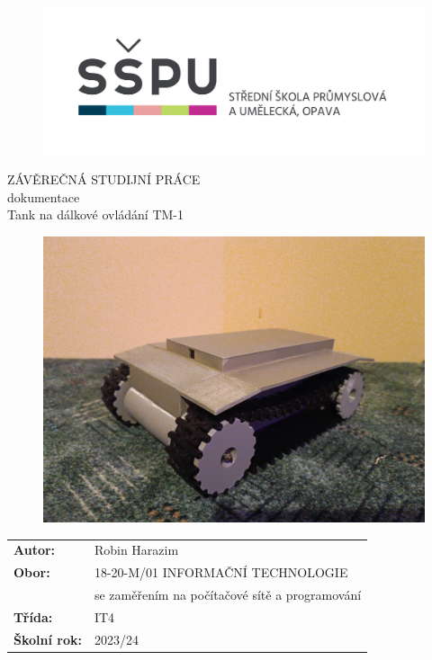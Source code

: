 \documentclass[12pt, a4paper,
oneside
openany
]{report}
\title{\nazevPrace} %
\author{\jmenoAutora} %
\date{\datumOdevzdani} %
\newcommand\obor{INFORMAČNÍ TECHNOLOGIE} %
\newcommand\kodOboru{18-20-M/01} %
\newcommand\zamereni{se zaměřením na počítačové sítě a programování} %
\newcommand\trida{IT4} %
\newcommand\jmenoAutora{Robin Harazim}  %
\newcommand\skolniRok{2023/24} %
\newcommand\nazevPrace{Tank na dálkové ovládání TM-1} %
\begin{document}
	
    \setcounter{page}{1}
    \pagestyle{empty}

	
	{\selectfont
		\begin{figure}[h]
			\centering
			\includegraphics[width=0.6\linewidth]{image/logo-skoly.png} 
		\end{figure}
		
		
		{\bfseries %
			\begin{center}
				\vspace{0.025 \textheight}
				\LARGE{ZÁVĚREČNÁ STUDIJNÍ PRÁCE}\\
				\large{dokumentace}\\
				\vspace{0.075 \textheight}
				\LARGE {\nazevPrace}\\
			\end{center}  
		}%
		
		\begin{figure}[ht]
			\centering
			\includegraphics[width=0.65\linewidth]{image/IMG_20240114_195803.jpg} 
		\end{figure}
		
		\vspace{0.02 \textheight}
		\begin{table}[h!]
			\begin{tabular}{ll}
				\textbf{Autor:} & \jmenoAutora\\ 
				\textbf{Obor:} & \kodOboru { } \obor\\
				\textbf{} & \zamereni\\
				\textbf{Třída:} & \trida\\
				\textbf{Školní rok:} & \skolniRok\\
			\end{tabular}
			
		\end{table}		
	}
	
\end{document}
